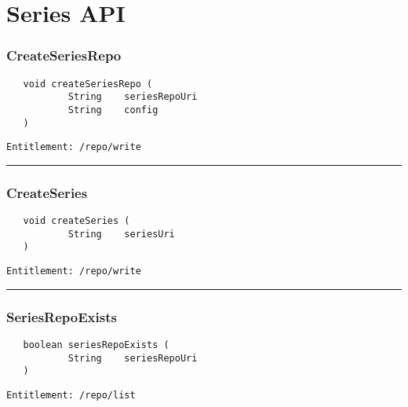 \chapter{Series API}

\subsection{CreateSeriesRepo}
\label{Api:CreateSeriesRepo}
\begin{Verbatim}
   void createSeriesRepo (
           String    seriesRepoUri
           String    config
   )
\end{Verbatim}
\begin{Verbatim}[formatcom=\color{Maroon}]
  Entitlement: /repo/write
\end{Verbatim}



\rule{12cm}{2pt}
\subsection{CreateSeries}
\label{Api:CreateSeries}
\begin{Verbatim}
   void createSeries (
           String    seriesUri
   )
\end{Verbatim}
\begin{Verbatim}[formatcom=\color{Maroon}]
  Entitlement: /repo/write
\end{Verbatim}



\rule{12cm}{2pt}
\subsection{SeriesRepoExists}
\label{Api:SeriesRepoExists}
\begin{Verbatim}
   boolean seriesRepoExists (
           String    seriesRepoUri
   )
\end{Verbatim}
\begin{Verbatim}[formatcom=\color{Maroon}]
  Entitlement: /repo/list
\end{Verbatim}



